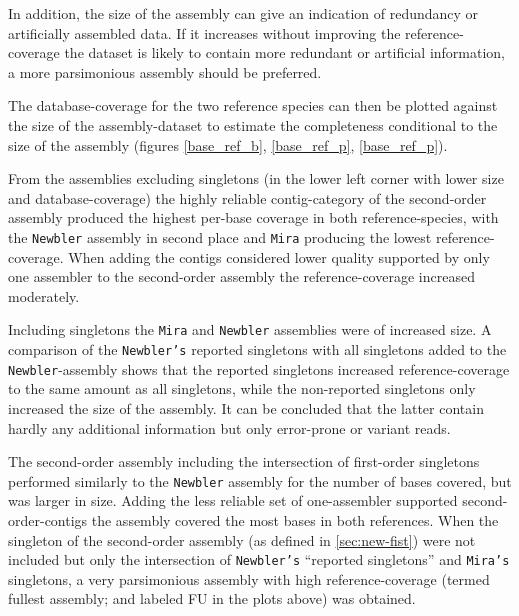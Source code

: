 In addition, the size of the assembly can give an indication of
redundancy or artificially assembled data. If it increases without
improving the reference-coverage the dataset is likely to contain more
redundant or artificial information, a more parsimonious assembly
should be preferred.

The database-coverage for the two reference species can then be
plotted against the size of the assembly-dataset to estimate the
completeness conditional to the size of the assembly (figures
\ref{base_ref_b}, \ref{base_ref_p}, \ref{base_ref_p}).

From the assemblies excluding singletons (in the lower left corner
with lower size and database-coverage) the highly reliable
contig-category of the second-order assembly produced the highest
per-base coverage in both reference-species, with the \texttt{Newbler}
assembly in second place and \texttt{Mira} producing the lowest
reference-coverage. When adding the contigs considered lower quality
supported by only one assembler to the second-order assembly the
reference-coverage increased moderately.

Including singletons the \texttt{Mira} and \texttt{Newbler} assemblies
were of increased size. A comparison of the \texttt{Newbler's}
reported singletons with all singletons added to the
\texttt{Newbler}-assembly shows that the reported singletons increased
reference-coverage to the same amount as all singletons, while the
non-reported singletons only increased the size of the assembly. It
can be concluded that the latter contain hardly any additional
information but only error-prone or variant reads.

The second-order assembly including the intersection of first-order
singletons performed similarly to the \texttt{Newbler} assembly for
the number of bases covered, but was larger in size. Adding the less
reliable set of one-assembler supported second-order-contigs the
assembly covered the most bases in both references. When the singleton
of the second-order assembly (as defined in \ref{sec:new-fist}) were
not included but only the intersection of \texttt{Newbler's}
``reported singletons'' and \texttt{Mira's} singletons, a very
parsimonious assembly with high reference-coverage (termed fullest
assembly; and labeled FU in the plots above) was obtained.




